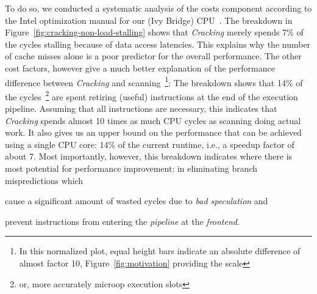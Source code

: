 To do so, we conducted a systematic analysis of the costs component
according to the Intel optimization manual for our (Ivy Bridge)
CPU~\cite{intelOptimizationManual}. The breakdown in Figure~\ref{fig:cracking-non-load-stalling} shows that
\emph{Cracking} merely spends 7\% of the cycles stalling because of
data access latencies. This explains why the number of cache misses
alone is a poor predictor for the overall performance. The other cost
factors, however give a much better explanation of the performance
difference between \emph{Cracking} and scanning~\footnote{In this
  normalized plot, equal height bars indicate an absolute difference of
  almost factor 10, Figure~\ref{fig:motivation} providing the scale}:
The breakdown shows that 14\% of the cycles~\footnote{or, more
  accurately microop execution slots} are spent retiring (useful)
instructions at the end of the execution pipeline. Assuming that all
instructions are necessary, this indicates that \emph{Cracking} spends
almost 10 times as much CPU cycles as scanning doing actual work. It
also gives us an upper bound on the performance that can be achieved
using a single CPU core: 14\% of the current runtime, i.e., a speedup
factor of about 7. Most importantly, however, this breakdown indicates
where there is most potential for performance improvement: in
eliminating branch mispredictions which
\begin{inparaenum}
\item cause a significant amount of wasted cycles due to \emph{bad speculation} and
\item prevent instructions from entering the \emph{pipeline} at the
  \emph{frontend}.
\end{inparaenum}


